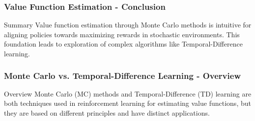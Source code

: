 \documentclass[aspectratio=169]{beamer}
\begin{document}
\begin{frame}[fragile]
    \frametitle{Value Function Estimation - Conclusion}
    \begin{block}{Summary}
        Value function estimation through Monte Carlo methods is intuitive for aligning policies towards maximizing rewards in stochastic environments. This foundation leads to exploration of complex algorithms like Temporal-Difference learning.
    \end{block}
\end{frame}

\begin{frame}[fragile]
  \frametitle{Monte Carlo vs. Temporal-Difference Learning - Overview}
  \begin{block}{Overview}
    Monte Carlo (MC) methods and Temporal-Difference (TD) learning are both techniques used in reinforcement learning for estimating value functions, but they are based on different principles and have distinct applications.
  \end{block}
\end{frame}
\end{document}
